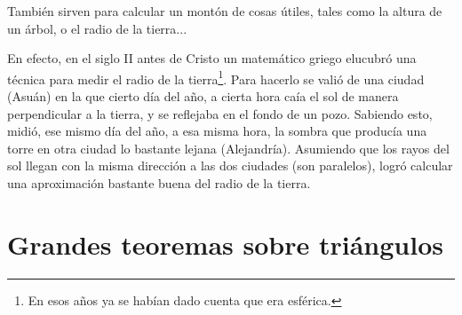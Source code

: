 También sirven para calcular un montón de cosas útiles, tales como la altura de un árbol, o el radio de la tierra...

En efecto, en el siglo II antes de Cristo un matemático griego elucubró una técnica para medir el radio de la tierra\footnote{En esos años ya se habían dado cuenta que era esférica.}.
Para hacerlo se valió de una ciudad (Asuán) en la que cierto día del año, a cierta hora caía el sol de manera perpendicular a la tierra, y se reflejaba en el fondo de un pozo.
Sabiendo esto, midió, ese mismo día del año, a esa misma hora, la sombra que producía una torre en otra ciudad lo bastante lejana (Alejandría).
Asumiendo que los rayos del sol llegan con la misma dirección a las dos ciudades (son paralelos), logró calcular una aproximación bastante buena del radio de la tierra.

\begin{center}
\end{center}


\section{Grandes teoremas sobre triángulos}

